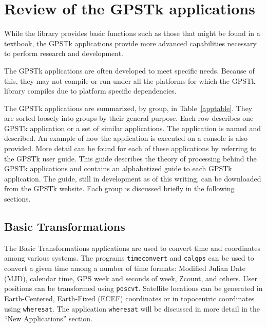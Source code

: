 \documentclass{ion-gps}
\newcommand{\gpstkapplication}[1]{\texttt{#1}}
\begin{document}
\section*{Review of the GPSTk applications}

While the library provides basic functions such as those that might be
found in a textbook, the GPSTk applications provide more advanced
capabilities necessary to perform research and development.

The GPSTk applications are often developed to meet specific needs. Because
of this, they may not compile or run under all the platforms for which the
GPSTk library compiles due to platform specific dependencies.

The GPSTk applications are summarized, by group, in
Table~\ref{apptable}. They are sorted loosely into groups by their general 
purpose. Each row describes one GPSTk application or a
set of similar applications. The application is named and
described. An example of how the application is executed on a console
is also provided. More detail can be found for each of these
applications by referring to the GPSTk user
guide. This guide describes the theory of processing behind the GPSTk
applications and contains an alphabetized guide to
each GPSTk application. The guide, still in development as of this
writing, can be downloaded from the GPSTk website\cite{gpstkguide}.
Each group is discussed briefly in the following sections.


%  

\subsection*{Basic Transformations}
The Basic Transformations applications are used to convert time and coordinates among
various systems. The programs \gpstkapplication{timeconvert} and
\gpstkapplication{calgps} can be used to convert a given time among a
number of time formats: Modified Julian Date (MJD), calendar time, GPS
week and seconds of week, Zcount, and others. User positions can
be transformed using \gpstkapplication{poscvt}. Satellite locations
can be generated in Earth-Centered, Earth-Fixed (ECEF) coordinates or
in topocentric coordinates using \gpstkapplication{wheresat}. The
application \gpstkapplication{wheresat} will be discussed in more detail 
in the ``New Applications'' section.
\end{document}
